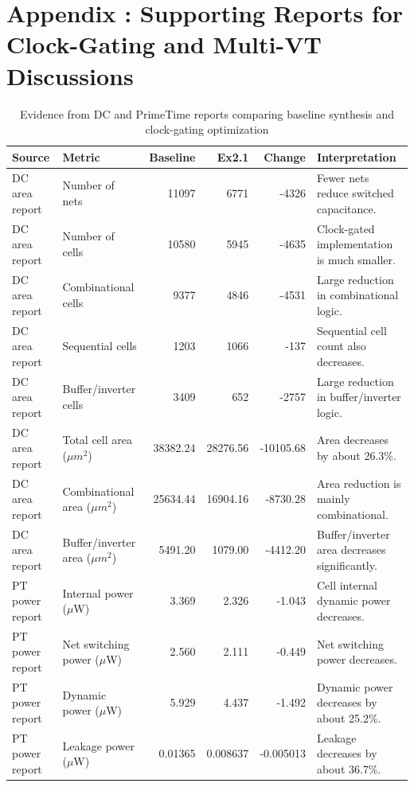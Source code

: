 \documentclass[11pt,a4paper]{article}
\begin{document}
\section*{Appendix : Supporting Reports for Clock-Gating and Multi-VT Discussions}

\begin{table}[h]
\centering
\scriptsize
\setlength{\tabcolsep}{3pt}
\renewcommand{\arraystretch}{1.15}
\caption{Evidence from DC and PrimeTime reports comparing baseline synthesis and clock-gating optimization}
\begin{tabularx}{\textwidth}{llrrrX}
\toprule
\textbf{Source} & \textbf{Metric} & \textbf{Baseline} & \textbf{Ex2.1} & \textbf{Change} & \textbf{Interpretation} \\
\midrule
DC area report & Number of nets & 11097 & 6771 & -4326 & Fewer nets reduce switched capacitance. \\
DC area report & Number of cells & 10580 & 5945 & -4635 & Clock-gated implementation is much smaller. \\
DC area report & Combinational cells & 9377 & 4846 & -4531 & Large reduction in combinational logic. \\
DC area report & Sequential cells & 1203 & 1066 & -137 & Sequential cell count also decreases. \\
DC area report & Buffer/inverter cells & 3409 & 652 & -2757 & Large reduction in buffer/inverter logic. \\
DC area report & Total cell area ($\mu m^2$) & 38382.24 & 28276.56 & -10105.68 & Area decreases by about 26.3\%. \\
DC area report & Combinational area ($\mu m^2$) & 25634.44 & 16904.16 & -8730.28 & Area reduction is mainly combinational. \\
DC area report & Buffer/inverter area ($\mu m^2$) & 5491.20 & 1079.00 & -4412.20 & Buffer/inverter area decreases significantly. \\
\midrule
PT power report & Internal power ($\mu$W) & 3.369 & 2.326 & -1.043 & Cell internal dynamic power decreases. \\
PT power report & Net switching power ($\mu$W) & 2.560 & 2.111 & -0.449 & Net switching power decreases. \\
PT power report & Dynamic power ($\mu$W) & 5.929 & 4.437 & -1.492 & Dynamic power decreases by about 25.2\%. \\
PT power report & Leakage power ($\mu$W) & 0.01365 & 0.008637 & -0.005013 & Leakage decreases by about 36.7\%. \\

\end{tabularx}
\end{table}
\end{document}
